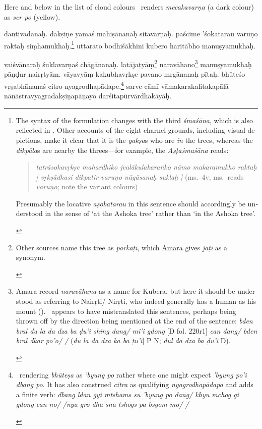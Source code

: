 \documentclass[naipra.tex]{subfiles}
\begin{document}
\begin{sanskrit}
{\begin{english}
		Here and below in the list of cloud colours \TIB\ renders \emph{mecakavarṇa} (a dark colour) as \emph{ser po} (yellow).
	\end{english}
} dantivadanaḥ.
dakṣiṇe yamaś  mahiṣānanaḥ sitavarṇaḥ.
paścime 'śokatarau varuṇo raktaḥ siṃhamukhaḥ.\footnote{
	\begin{english}%
		The syntax of the formulation changes with the third \emph{śmaśāna}, which is also reflected in \TIB .
		Other accounts of the eight charnel grounds, including visual depictions, make it clear that it is the \emph{yakṣa}s who are \emph{in} the trees, whereas the \emph{dikpāla}s are nearby the threes—for example, the \emph{Aṣṭaśmaśāna} reads:

		\begin{quote}
			\emph{tatrāsokavṛkṣe mahardhiko jvalākulakaraṅko nāmo makaramukho raktaḥ | vṛkṣādhasi dikpatir varuṇo nāgāsanaḥ suklaḥ |} (ms.\ 4v; ms.\ reads \emph{vāruṇo}; note the variant colours)
		\end{quote}

		\noindent Presumably the locative \emph{aṣokatarau} in this sentence should accordingly be understood in the sense of `at the Ashoka tree' rather than `in the Ashoka tree'.
	\end{english}
}
uttarato bodhiśākhini kubero haritābho manuṣyamukhaḥ.  
\pend

\pstart
{}  vaiśvānaraḥ śuklavarṇaś chāgānanaḥ.
latājaṭyāṃ\footnote{
	\begin{english}%
		Other sources name this tree as \emph{parkaṭī}, which Amara gives \emph{jaṭī} as a synonym.
	\end{english}
} naravāhano\footnote{
	\begin{english}%
		Amara record \emph{naravāhana} as a name for Kubera, but here it should be understood as referring to Nairṛti/ Nirṛti, who indeed generally has a human as his mount (\cite[98 ff.]{wesselsmevissen2001}). \TIB\ appears to have mistranslated this sentences, perhaps being thrown off by the direction being mentioned at the end of the sentence: \emph{bden bral du la da dza ba ḍu'i shing dang/ mi'i gdong} [D fol. 220r1] \emph{can dang/ bden bral dkar po'o/ /} (\emph{du la da dza ka ba ṭu'i}] P N; \emph{dul da dza ba ḍu'i} D).
	\end{english}
} manuṣyamukhaḥ pāṇḍur nairṛtyām.
vāyavyāṃ kakubhavṛkṣe pavano mṛgānanaḥ pītaḥ.
 bhūteśo vṛṣabhānanaś citro nyagrodhapādape.\footnote{
	\begin{english}%
		\TIB\ rendering \emph{bhūteṣa} as \emph{'byung po} rather where one might expect \emph{'byung po'i dbang po}. It has also construed \emph{citra} as qualifying \emph{nyagrodhapādapa} and adds a finite verb: \emph{dbang ldan gyi mtshams su 'byung po dang/ khyu mchog gi gdong can no/ /nya gro dha sna tshogs pa bsgom mo/ /}
	\end{english}
}
sarve cāmī vāmakarakalitakapālā nānāstravyagradakṣiṇapāṇayo darśitapūrvārdhakāyāḥ.
\pend


\end{sanskrit}
\end{document}
